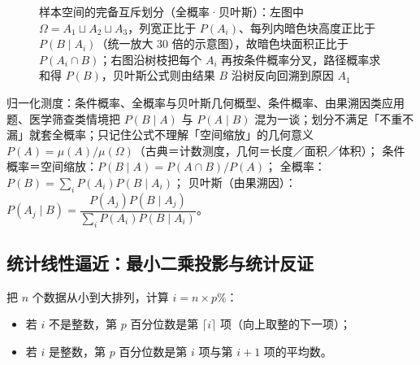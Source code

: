 \begin{explore}
\begin{figure}[htbp]
  \caption{样本空间的完备互斥划分（全概率·贝叶斯）：左图中 $\Omega=A_1\sqcup A_2\sqcup A_3$，列宽正比于 $P(A_i)$、每列内暗色块高度正比于 $P(B\mid A_i)$（统一放大 $30$ 倍的示意图），故暗色块面积正比于 $P(A_i\cap B)$；右图沿树枝把每个 $A_i$ 再按条件概率分叉，路径概率求和得 $P(B)$，贝叶斯公式则由结果 $B$ 沿树反向回溯到原因 $A_1$}
  \label{fig:ch07-partition}
\end{figure}

\begin{conccard}[一级]{归一化测度：条件概率、全概率与贝叶斯}{几何概型、条件概率、由果溯因类应用题、医学筛查类情境}{把 $P(B\mid A)$ 与 $P(A\mid B)$ 混为一谈；划分不满足「不重不漏」就套全概率；只记住公式不理解「空间缩放」的几何意义}
$P(A)=\mu(A)/\mu(\Omega)$（古典＝计数测度，几何＝长度／面积／体积）；
条件概率＝空间缩放：$P(B\mid A)=P(A\cap B)/P(A)$；
全概率：$P(B)=\sum_i P(A_i)P(B\mid A_i)$；
贝叶斯（由果溯因）：$P(A_j\mid B)=\dfrac{P(A_j)P(B\mid A_j)}{\sum_i P(A_i)P(B\mid A_i)}$。
\end{conccard}

\subsection{统计线性逼近：最小二乘投影与统计反证}


把 $n$ 个数据从小到大排列，计算 $i=n\times p\%$：
\begin{itemize}
  \item 若 $i$ 不是整数，第 $p$ 百分位数是第 $\lceil i\rceil$ 项（向上取整的下一项）；
  \item 若 $i$ 是整数，第 $p$ 百分位数是第 $i$ 项与第 $i+1$ 项的平均数。
\end{itemize}


\end{explore}
